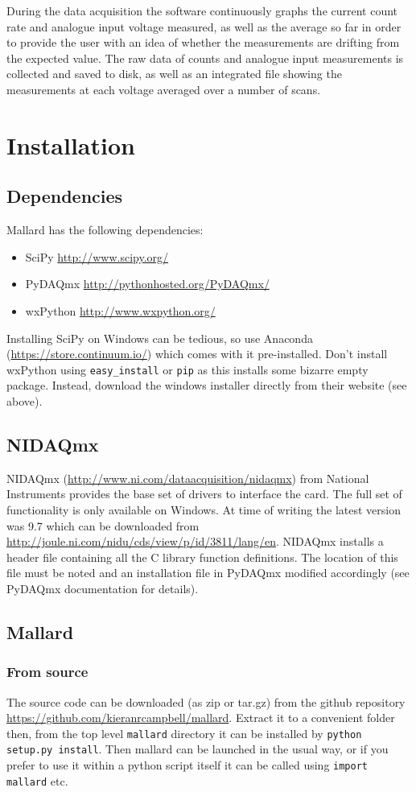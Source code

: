 \documentclass[10pt,a4paper]{article}
\begin{document}
During the data acquisition the software continuously graphs the current count rate and analogue input voltage measured, as well as the average so far in order to provide the user with an idea of whether the measurements are drifting from the expected value. The raw data of counts and analogue input measurements is collected and saved to disk, as well as an integrated file showing the measurements at each voltage averaged over a number of scans.

\section{Installation}
\subsection{Dependencies}
Mallard has the following dependencies:
\begin{itemize}
\item SciPy \url{http://www.scipy.org/}
\item PyDAQmx \url{http://pythonhosted.org/PyDAQmx/}
\item wxPython \url{http://www.wxpython.org/}
\end{itemize}
Installing SciPy on Windows can be tedious, so use Anaconda (\url{https://store.continuum.io/}) which comes with it pre-installed. Don't install wxPython using \texttt{easy\_install} or \texttt{pip} as this installs some bizarre empty package. Instead, download the windows installer directly from their website (see above).
\subsection{NIDAQmx}
NIDAQmx (\url{http://www.ni.com/dataacquisition/nidaqmx}) from National Instruments provides the base set of drivers to interface the card. The full set of functionality is only available on Windows. At time of writing the latest version was 9.7 which can be downloaded from \url{http://joule.ni.com/nidu/cds/view/p/id/3811/lang/en}. NIDAQmx installs a header file containing all the C library function definitions. The location of this file must be noted and an installation file in PyDAQmx modified accordingly (see PyDAQmx documentation for details).
\subsection{Mallard}
\subsubsection{From source}
The source code can be downloaded (as zip or tar.gz) from the github repository \url{https://github.com/kieranrcampbell/mallard}. Extract it to a convenient folder then, from the top level \texttt{mallard} directory it can be installed by \texttt{python setup.py install}. Then mallard can be launched in the usual way, or if you prefer to use it within a python script itself it can be called using \texttt{import mallard} etc.
\end{document}
